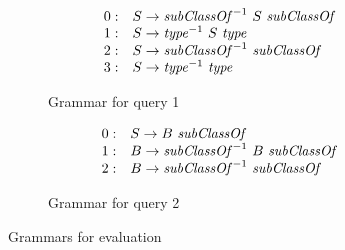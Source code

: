 \begin{figure*}[ht]
   \begin{center}
   \centering
   \begin{subfigure}[b]{0.4\textwidth}

   \[
\begin{array}{rl}
   0: & S \rightarrow \text{\textit{subClassOf}}^{-1} \ S \ \text{\textit{subClassOf}} \\ 
   1: & S \rightarrow \text{\textit{type}}^{-1} \ S \ \text{\textit{type}} \\ 
   2: & S \rightarrow \text{\textit{subClassOf}}^{-1} \ \text{\textit{subClassOf}} \\ 
   3: & S \rightarrow \text{\textit{type}}^{-1} \ \text{\textit{type}} \\ 
\end{array}
\]
   \caption{Grammar for query 1}
   \label{grammarQ1}
   \end{subfigure}
   \hspace{2em}
   \begin{subfigure}[b]{0.4\textwidth}
   \[
\begin{array}{rl}
   0: & S \rightarrow B \ \text{\textit{subClassOf}} \\ 
   1: & B \rightarrow \text{\textit{subClassOf}}^{-1} \ B \ \text{\textit{subClassOf}} \\
   2: & B \rightarrow \text{\textit{subClassOf}}^{-1} \ \text{\textit{subClassOf}} \\ 
\end{array}
\]
   \caption{Grammar for query 2}
   \label{grammarQ2}        
   \end{subfigure}
   \end{center}
   \caption{Grammars for evaluation}
    \label{GrammarsForEvaluation}
\end{figure*}



